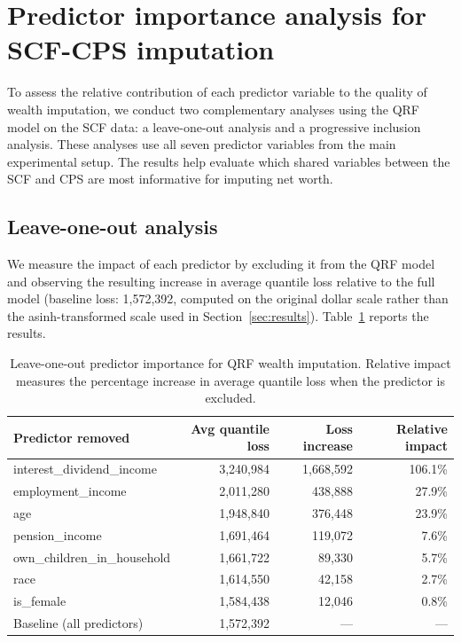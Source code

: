 \section{Predictor importance analysis for SCF-CPS imputation}\label{app:robustness}

To assess the relative contribution of each predictor variable to the quality of wealth imputation, we conduct two complementary analyses using the QRF model on the SCF data: a leave-one-out analysis and a progressive inclusion analysis. These analyses use all seven predictor variables from the main experimental setup. The results help evaluate which shared variables between the SCF and CPS are most informative for imputing net worth.

\subsection{Leave-one-out analysis}

We measure the impact of each predictor by excluding it from the QRF model and observing the resulting increase in average quantile loss relative to the full model (baseline loss: 1,572,392, computed on the original dollar scale rather than the asinh-transformed scale used in Section~\ref{sec:results}). Table~\ref{tab:leave_one_out} reports the results.

\begin{table}[H]
    \centering
    \caption{Leave-one-out predictor importance for QRF wealth imputation. Relative impact measures the percentage increase in average quantile loss when the predictor is excluded.}
    \label{tab:leave_one_out}
    \begin{tabular}{lrrr}
        \toprule
        Predictor removed & Avg quantile loss & Loss increase & Relative impact \\
        \midrule
        interest\_dividend\_income & 3,240,984 & 1,668,592 & 106.1\% \\
        employment\_income & 2,011,280 & 438,888 & 27.9\% \\
        age & 1,948,840 & 376,448 & 23.9\% \\
        pension\_income & 1,691,464 & 119,072 & 7.6\% \\
        own\_children\_in\_household & 1,661,722 & 89,330 & 5.7\% \\
        race & 1,614,550 & 42,158 & 2.7\% \\
        is\_female & 1,584,438 & 12,046 & 0.8\% \\
        \midrule
        Baseline (all predictors) & 1,572,392 & --- & --- \\
        \bottomrule
    \end{tabular}
\end{table}

